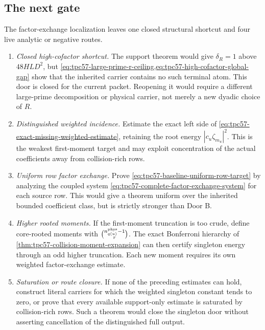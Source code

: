 \subsection{The next gate}

The factor-exchange localization leaves one closed structural shortcut and
four live analytic or negative routes.
\begin{enumerate}[label=\textbf{Door \Alph*.},leftmargin=3.8em]
 \item \emph{Closed high-cofactor shortcut.}
       The support theorem would give \(\delta_R=1\) above
       \(48HLD^2\), but
       \cref{eq:tpc57-large-prime-r-ceiling,eq:tpc57-high-cofactor-global-gap}
       show that the inherited carrier contains no such terminal atom.  This
       door is closed for the current packet.  Reopening it would require a
       different large-prime decomposition or physical carrier, not merely a
       new dyadic choice of \(R\).
 \item \emph{Distinguished weighted incidence.}
       Estimate the exact left side of
       \eqref{eq:tpc57-exact-missing-weighted-estimate}, retaining the root
       energy \(|c_u\zeta_{m_u}|^2\).  This is the weakest first-moment
       target and may exploit concentration of the actual coefficients away
       from collision-rich rows.
 \item \emph{Uniform row factor exchange.}
       Prove \eqref{eq:tpc57-baseline-uniform-row-target} by analyzing the
       coupled system \eqref{eq:tpc57-complete-factor-exchange-system} for
       each source row.  This would give a theorem uniform over the inherited
       bounded coefficient class, but is strictly stronger than Door B.
 \item \emph{Higher rooted moments.}
       If the first-moment truncation is too crude, define core-rooted
       moments with
       \(\binom{n_{q(u)}^{\rm phys}-1}{r}\).  The exact Bonferroni hierarchy
       of \cref{thm:tpc57-collision-moment-expansion} can then certify
       singleton energy through an odd higher truncation.  Each new moment
       requires its own weighted factor-exchange estimate.
 \item \emph{Saturation or route closure.}
       If none of the preceding estimates can hold, construct literal
       carriers for which the weighted singleton constant tends to zero, or
       prove that every available support-only estimate is saturated by
       collision-rich rows.  Such a theorem would close the singleton door
       without asserting cancellation of the distinguished full output.
\end{enumerate}

